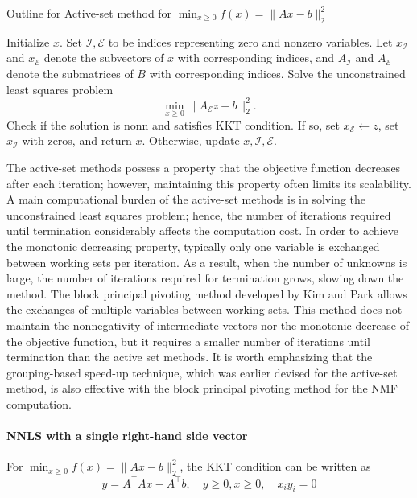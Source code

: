\documentclass[conference,onecolumn,12pt]{IEEEtran}
\numberwithin{equation}{section}
\numberwithin{figure}{section}
\numberwithin{table}{section}
\theoremstyle{definition}
\begin{document}
\begin{algorithm}
	\caption{Outline for Active-set method for $\min_{x\geq 0}f(x)=\|Ax-b\|_2^2$} 
	\begin{algorithmic}[1]
		\State Initialize $x$.
		\State Set $\mathcal{I},\mathcal{E}$ to be indices representing zero and nonzero variables. Let $x_{\mathcal{I}}$ and $x_{\mathcal{E}}$ denote the subvectors of $x$ with corresponding indices, and $A_{\mathcal{I}}$ and $A_{\mathcal{E}}$ denote the submatrices of $B$ with corresponding indices.
		\State Solve the unconstrained least squares problem
		\begin{equation}
			\min_{x\geq 0} \|A_{\mathcal{E}}z-b\|_2^2.
		\end{equation}
		\State Check if the solution is nonn and satisfies KKT condition. If so, set $x_{\mathcal{E}}\gets z$, set $x_{\mathcal{I}}$ with zeros, and return $x$. Otherwise, update $x, \mathcal{I},\mathcal{E}$.
		\EndFor
	\end{algorithmic} 
	\label{alg:pgd}
\end{algorithm}

The active-set methods possess a property that the objective function decreases after each iteration; however, maintaining this property often limits its scalability. A main computational burden of the active-set methods is in solving the unconstrained least squares problem; hence, the number of iterations required until termination considerably affects the computation cost. In order to achieve the monotonic decreasing property, typically only one variable is exchanged between working sets per iteration. As a result, when the number of unknowns is large, the number of iterations required for termination grows, slowing down the method. The block principal pivoting method developed by Kim and Park \cite{10.1137/110821172} allows the exchanges of multiple variables between working sets. This method does not maintain the nonnegativity of intermediate vectors nor the monotonic decrease of the objective function, but it requires a smaller number of iterations until termination than the active set methods. It is worth emphasizing that the grouping-based speed-up technique, which was earlier devised for the active-set method, is also effective with the block principal pivoting method for the NMF computation.

\paragraph{NNLS with a single right-hand side vector}
For $\min_{x\geq 0}f(x)=\|Ax-b\|_2^2$, the KKT condition can be written as 
\begin{equation}
	\label{kkt-single}
	y=A^\top Ax-A^\top b,\quad y\geq 0, x\geq 0,\quad x_iy_i=0
\end{equation}
\end{document}
